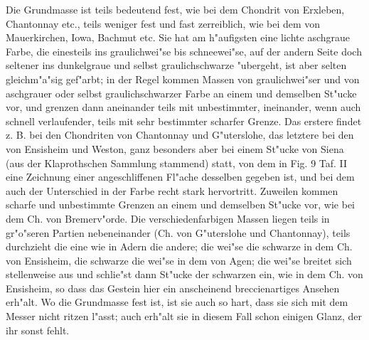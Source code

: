 \documentclass[a4paper, 11pt, oneside]{article}
\begin{document}
Die Grundmasse ist teils bedeutend fest, wie bei dem Chondrit von Erxleben, Chantonnay etc., teils weniger fest und fast zerreiblich, wie bei dem von Mauerkirchen, Iowa, Bachmut etc. Sie hat am h"aufigsten eine lichte aschgraue Farbe, die einesteils ins graulichwei"se bis schneewei"se, auf der andern Seite doch seltener ins dunkelgraue und selbst graulichschwarze "ubergeht, ist aber selten gleichm"a"sig gef"arbt; in der Regel kommen Massen von graulichwei"ser und von aschgrauer oder selbst graulichschwarzer Farbe an einem und demselben St"ucke vor, und grenzen dann aneinander teils mit unbestimmter, ineinander, wenn auch schnell verlaufender, teils mit sehr bestimmter scharfer Grenze. Das erstere findet z. B. bei den Chondriten von Chantonnay und G"uterslohe, das letztere bei den von Ensisheim und Weston, ganz besonders aber bei einem St"ucke von Siena (aus der Klaprothschen Sammlung stammend) statt, von dem in Fig. 9 Taf. II eine Zeichnung einer angeschliffenen Fl"ache desselben gegeben ist, und bei dem auch der Unterschied in der Farbe recht stark hervortritt. Zuweilen kommen scharfe und unbestimmte Grenzen an einem und demselben St"ucke vor, wie bei dem Ch. von Bremerv"orde. Die verschiedenfarbigen Massen liegen teils in gr"o"seren Partien nebeneinander (Ch. von G"uterslohe und Chantonnay), teils durchzieht die eine wie in Adern die andere; die wei"se die schwarze in dem Ch. von Ensisheim, die schwarze die wei"se in dem von Agen; die wei"se breitet sich stellenweise aus und schlie"st dann St"ucke der schwarzen ein, wie in dem Ch. von Ensisheim, so dass das Gestein hier ein anscheinend breccienartiges Ansehen erh"alt. Wo die Grundmasse fest ist, ist sie auch so hart, dass sie sich mit dem Messer nicht ritzen l"asst; auch erh"alt sie in diesem Fall schon einigen Glanz, der ihr sonst fehlt.
\end{document}
